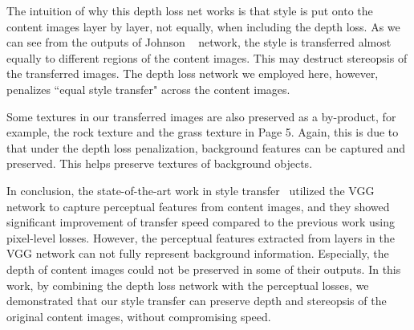\documentclass[10pt,twocolumn,letterpaper]{article}
\begin{document}
The intuition of why this depth loss net works is that style is put onto the content images layer by layer, not equally, when including the depth loss. As we can see from the outputs of Johnson \etal~\cite{johnson2016perceptual} network, the style is transferred almost equally to different regions of the content images. This may destruct stereopsis of the transferred images. The depth loss network we employed here, however, penalizes ``equal style transfer" across the content images.  

Some textures in our transferred images are also preserved as a by-product, for example, the rock texture and the grass texture in Page 5. Again, this is due to that under the depth loss penalization, background features can be captured and preserved. This helps preserve textures of background objects.

In conclusion, the state-of-the-art work in style transfer~\cite{johnson2016perceptual} utilized the VGG network to capture perceptual features from content images, and they showed significant improvement of transfer speed compared to the previous work using pixel-level losses. However, the perceptual features extracted from layers in the VGG network can not fully represent background information. Especially, the depth of content images could not be preserved in some of their outputs. In this work, by combining the depth loss network with the perceptual losses, we demonstrated that our style transfer can preserve depth and stereopsis of the original content images, without compromising speed. 

{\small


}
\end{document}
